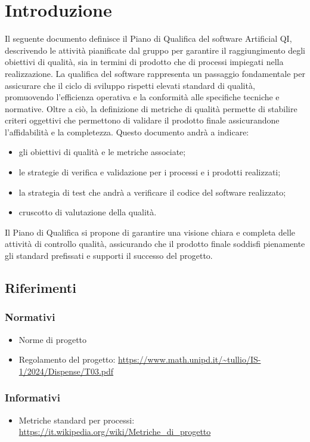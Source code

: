 \section{Introduzione}
\label{sec:introduzione_pq}
Il seguente documento definisce il Piano di Qualifica del software Artificial QI, descrivendo le attività  pianificate dal gruppo
per garantire il raggiungimento degli obiettivi di qualità, sia in termini di prodotto che di processi impiegati nella realizzazione.
La qualifica del software rappresenta un passaggio fondamentale per assicurare che il ciclo di sviluppo rispetti elevati standard di qualità, 
promuovendo l'efficienza operativa e la conformità alle specifiche tecniche e normative.
Oltre a ciò, la definizione di metriche di qualità permette di stabilire criteri oggettivi che permettono di validare il prodotto finale 
assicurandone l'affidabilità e la completezza.
Questo documento andrà a indicare:
\begin{itemize}
    \item gli obiettivi di qualità e le metriche associate;
    \item le strategie di verifica e validazione per i processi e i prodotti realizzati;
    \item la strategia di test che andrà a verificare il codice del software realizzato;
    \item cruscotto di valutazione della qualità.
\end{itemize}
Il Piano di Qualifica si propone di garantire una visione chiara e completa delle attività di controllo qualità, 
assicurando che il prodotto finale soddisfi pienamente gli standard prefissati e supporti il successo del progetto.
\subsection{Riferimenti}
\subsubsection{Normativi}
\begin{itemize}
    \item Norme di progetto
    \item Regolamento del progetto: \url{https://www.math.unipd.it/~tullio/IS-1/2024/Dispense/T03.pdf}
\end{itemize}
\subsubsection{Informativi}
\begin{itemize}
    \item Metriche standard per processi: \url{https://it.wikipedia.org/wiki/Metriche_di_progetto}
\end{itemize}


